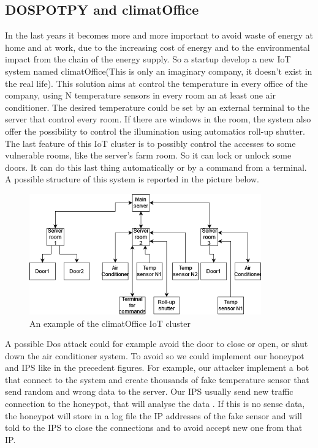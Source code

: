 \subsection{DOSPOTPY and climatOffice}
In the last years it becomes more and more important to avoid waste of energy at home and at work, due to the increasing cost of energy and to the environmental impact from the chain of the energy supply. So a startup develop a new IoT system named climatOffice(This is only an imaginary company, it doesn't exist in the real life). This solution aims at control the temperature in every office of the company, using N temperature sensors in every room an at least one air conditioner. The desired temperature could be set by an external terminal to the server that control every room. If there are windows in the room, the system also offer the possibility to control the illumination using automatics roll-up shutter. The last feature of this IoT cluster is to possibly control the accesses to some vulnerable rooms, like the server's farm room. So it can lock or unlock some doors. It can do this last thing automatically or by a command from a terminal. A possible structure of this system is reported in the picture below.
\begin{figure}[h!]
  \centering
  \includegraphics[width = 10cm]{images/climatOffice.drawio.png}
  \caption{An example of the climatOffice IoT cluster}
  \label{fig:TCPDos}
\end{figure}
\FloatBarrier
\noindent
A possible Dos attack could for example avoid the door to close or open, or shut down the air conditioner system. To avoid so we could implement our honeypot and IPS like in the precedent figures. For example, our attacker implement a bot that connect to the system and create thousands of fake temperature sensor that send random and wrong data to the server. Our IPS usually send new traffic connection to the honeypot, that will analyse the data . If this is no sense data, the honeypot will store in a log file the IP addresses of the fake sensor and will told to the IPS to close the connections and to avoid accept new one from that IP.





